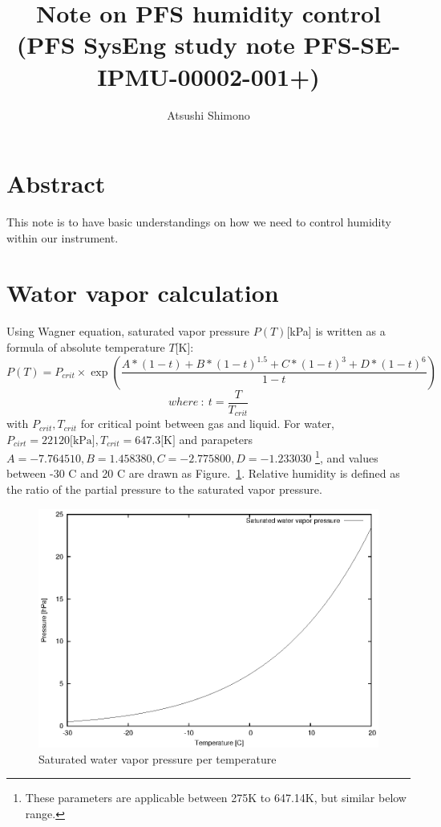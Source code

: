 \documentclass[a4paper,notitlepage]{article}
\title{Note on PFS humidity control \\ 
    (PFS SysEng study note PFS-SE-IPMU-00002-001+)}
\author{Atsushi Shimono}
\begin{document}
\renewcommand{\leftmark} {Note on PFS humidity control (PFS-SE-IPMU-00002-001+)}
\renewcommand{\rightmark}{Note on PFS humidity control (PFS-SE-IPMU-00002-001+)}

\maketitle
\tableofcontents

\section{Abstract}

This note is to have basic understandings on how we need to control humidity 
within our instrument. 


\section{Wator vapor calculation}

Using Wagner equation, saturated vapor pressure $P(T)$[kPa] is written as a 
formula of absolute temperature $T$[K]: 
\[ P(T) = P_{crit} \times \exp\left(\frac
     {A * (1-t) + B * (1-t)^{1.5} + C * (1-t)^3 + D * (1-t)^6}{1-t} \right) \]
\[ where \ : \  t = \frac{T}{T_{crit}} \]
with $P_{crit}, T_{crit}$ for critical point between gas and liquid. 
For water, 
$P_{cirt} = 22120 \text{[kPa]}, T_{crit} = 647.3 \text{[K]}$ 
and parapeters 
$A = -7.764510, B = 1.458380, C = -2.775800, D = -1.233030$
\footnote{These parameters are applicable between 275K to 647.14K, but 
similar below range.}, and values between -30 C and 20 C are drawn as 
Figure.~\ref{fig:sat-water-vapor}. 
Relative humidity is defined as the ratio of the partial pressure to the 
saturated vapor pressure. 

\begin{figure}[htb]
  \begin{center}
    \includegraphics{PFS-SE-IPMU-00002-sat-pressure-water.eps}
  \end{center}
  \caption{Saturated water vapor pressure per temperature}
  \label{fig:sat-water-vapor}
\end{figure}
\end{document}
